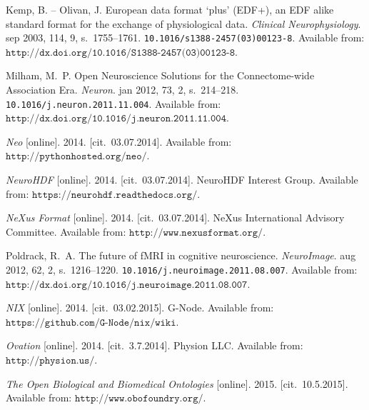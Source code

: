 \documentclass[conference]{IEEEtran}
\begin{document}
\begin{thebibliography}{1}
{\sc Kemp}, B. -- {\sc Olivan}, J.
\newblock European data format `plus' (EDF+), an {EDF} alike standard format
for the exchange of physiological data.
\newblock \emph{Clinical Neurophysiology}. sep 2003, 114, 9, s.~1755--1761.
\newblock \texttt{10.1016/s1388-2457(03)00123-8}.
\newblock Available from:
$\texttt{{http://dx.doi.org/10.1016/S1388-2457(03)00123-8}}$.




{\sc Milham}, M.~P.
\newblock Open Neuroscience Solutions for the Connectome-wide Association Era.
\newblock \emph{Neuron}. jan 2012, 73, 2, s.~214--218.
\newblock \texttt{10.1016/j.neuron.2011.11.004}.
\newblock Available from:
$\texttt{{http://dx.doi.org/10.1016/j.neuron.2011.11.004}}$.

\emph{Neo} [online]. 2014. [cit.~03.07.2014].
\newblock Available from: $\texttt{{http://pythonhosted.org/neo/}}$.

\emph{NeuroHDF} [online]. 2014. [cit.~03.07.2014]. NeuroHDF Interest Group.
\newblock Available from: $\texttt{{https://neurohdf.readthedocs.org/}}$.

\emph{NeXus Format} [online]. 2014. [cit.~03.07.2014]. NeXus International
Advisory Committee.
\newblock Available from: $\texttt{{http://www.nexusformat.org/}}$.




{\sc Poldrack}, R.~A.
\newblock The future of {fMRI} in cognitive neuroscience.
\newblock \emph{{NeuroImage}}. aug 2012, 62, 2, s.~1216--1220.
\newblock \texttt{10.1016/j.neuroimage.2011.08.007}.
\newblock Available from:
$\texttt{{http://dx.doi.org/10.1016/j.neuroimage.2011.08.007}}$.



\emph{NIX} [online]. 2014. [cit.~03.02.2015]. G-Node.
\newblock Available from: $\texttt{{https://github.com/G-Node/nix/wiki}}$.

\emph{Ovation} [online]. 2014. [cit.~3.7.2014]. Physion LLC.
\newblock Available from: $\texttt{{http://physion.us/}}$.


\emph{The Open Biological and Biomedical Ontologies} [online]. 2015.
[cit.~10.5.2015].
\newblock Available from: $\texttt{{http://www.obofoundry.org/}}$.
\end{thebibliography}




\end{document}
